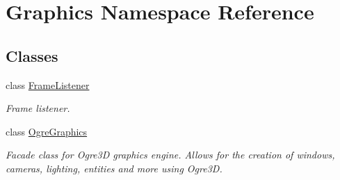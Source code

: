 \hypertarget{namespace_graphics}{\section{Graphics Namespace Reference}
\label{namespace_graphics}
}
\subsection*{Classes}
\begin{DoxyCompactItemize}
\item 
class \hyperlink{class_graphics_1_1_frame_listener}{Frame\-Listener}
\begin{DoxyCompactList}\small\item\em Frame listener. \end{DoxyCompactList}\item 
class \hyperlink{class_graphics_1_1_ogre_graphics}{Ogre\-Graphics}
\begin{DoxyCompactList}\small\item\em Facade class for Ogre3\-D graphics engine. Allows for the creation of windows, cameras, lighting, entities and more using Ogre3\-D. \end{DoxyCompactList}\end{DoxyCompactItemize}
